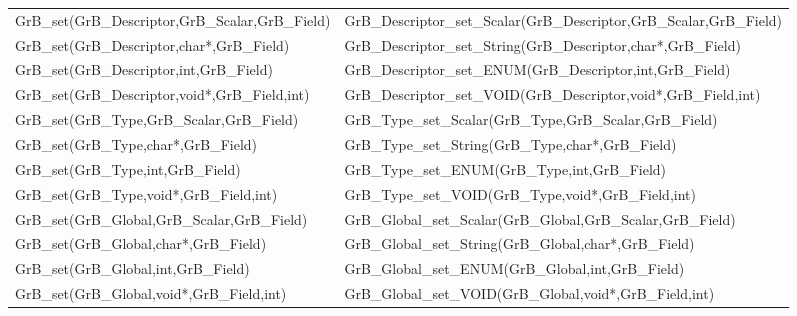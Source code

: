 \begin{table}[htb]
{\begin{tabular}{l|l}
{\sf GrB\_set(GrB\_Descriptor,GrB\_Scalar,GrB\_Field)}  & {\sf GrB\_Descriptor\_set\_Scalar(GrB\_Descriptor,GrB\_Scalar,GrB\_Field)} \\
{\sf GrB\_set(GrB\_Descriptor,char*,GrB\_Field)}        & {\sf GrB\_Descriptor\_set\_String(GrB\_Descriptor,char*,GrB\_Field)}       \\
{\sf GrB\_set(GrB\_Descriptor,int,GrB\_Field)}            & {\sf GrB\_Descriptor\_set\_ENUM(GrB\_Descriptor,int,GrB\_Field)}         \\
{\sf GrB\_set(GrB\_Descriptor,void*,GrB\_Field,int)}      & {\sf GrB\_Descriptor\_set\_VOID(GrB\_Descriptor,void*,GrB\_Field,int)}   \\
\hline

{\sf GrB\_set(GrB\_Type,GrB\_Scalar,GrB\_Field)}  & {\sf GrB\_Type\_set\_Scalar(GrB\_Type,GrB\_Scalar,GrB\_Field)} \\
{\sf GrB\_set(GrB\_Type,char*,GrB\_Field)}        & {\sf GrB\_Type\_set\_String(GrB\_Type,char*,GrB\_Field)}       \\
{\sf GrB\_set(GrB\_Type,int,GrB\_Field)}            & {\sf GrB\_Type\_set\_ENUM(GrB\_Type,int,GrB\_Field)}         \\
{\sf GrB\_set(GrB\_Type,void*,GrB\_Field,int)}      & {\sf GrB\_Type\_set\_VOID(GrB\_Type,void*,GrB\_Field,int)}   \\
\hline

{\sf GrB\_set(GrB\_Global,GrB\_Scalar,GrB\_Field)}  & {\sf GrB\_Global\_set\_Scalar(GrB\_Global,GrB\_Scalar,GrB\_Field)} \\
{\sf GrB\_set(GrB\_Global,char*,GrB\_Field)}        & {\sf GrB\_Global\_set\_String(GrB\_Global,char*,GrB\_Field)}       \\
{\sf GrB\_set(GrB\_Global,int,GrB\_Field)}            & {\sf GrB\_Global\_set\_ENUM(GrB\_Global,int,GrB\_Field)}         \\
{\sf GrB\_set(GrB\_Global,void*,GrB\_Field,int)}      & {\sf GrB\_Global\_set\_VOID(GrB\_Global,void*,GrB\_Field,int)}   \\
\hline
\end{tabular}
}
\label{Tab:NonPolymorphic7b}
\end{table}